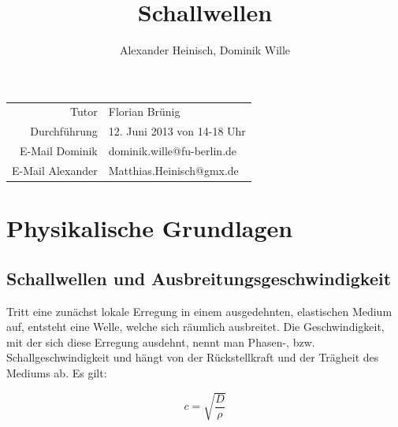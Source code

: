 \documentclass{article}
\title{Schallwellen}
\author{Alexander Heinisch, Dominik Wille}
\begin{document}
\maketitle

{\begin{center}
\begin{minipage}{\linewidth}
\centering
{}
\label{wtd}
\end{minipage}
\end{center}

\vspace{7cm}
\noindent
\begin{center}
\begin{tabular}{r l}
Tutor & Florian Brünig\\
Durchführung & 12. Juni 2013 von 14-18 Uhr \\

E-Mail Dominik & dominik.wille@fu-berlin.de \\
E-Mail Alexander & Matthias.Heinisch@gmx.de \\
\end{tabular}
\end{center}

\newpage
\tableofcontents
\newpage

\section{Physikalische Grundlagen}
\subsection{Schallwellen und Ausbreitungsgeschwindigkeit}
Tritt eine zunächst lokale Erregung in einem ausgedehnten, elastischen Medium auf, entsteht eine Welle, welche sich räumlich ausbreitet. Die Geschwindigkeit, mit der sich diese Erregung ausdehnt, nennt man Phasen-, bzw. Schallgeschwindigkeit und hängt von der Rückstellkraft und der Trägheit des Mediums ab. Es gilt:

\begin{equation}
\label{c}
c=\sqrt{\frac{D}{\rho}}
\end{equation}

}
\end{document}
